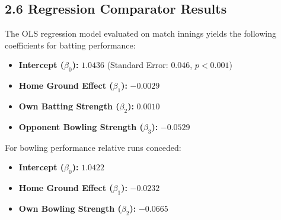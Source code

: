 \documentclass[11pt,a4paper]{article}
\begin{document}
  \subsection{2.6 Regression Comparator Results}
The OLS regression model evaluated on match innings yields the following coefficients for batting performance:
\begin{itemize}
    \item \textbf{Intercept ($\beta_0$):} $1.0436$ (Standard Error: $0.046$, $p < 0.001$)
    \item \textbf{Home Ground Effect ($\beta_1$):} $-0.0029$ 
    \item \textbf{Own Batting Strength ($\beta_2$):} $0.0010$ 
    \item \textbf{Opponent Bowling Strength ($\beta_3$):} $-0.0529$ 
\end{itemize}

For bowling performance relative runs conceded:
\begin{itemize}
    \item \textbf{Intercept ($\beta_0$):} $1.0422$
    \item \textbf{Home Ground Effect ($\beta_1$):} $-0.0232$ 
    \item \textbf{Own Bowling Strength ($\beta_2$):} $-0.0665$ 
\end{itemize}
\end{document}
